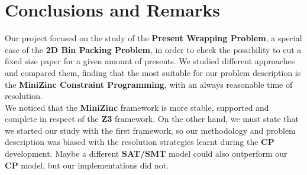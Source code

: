 \chapter{Conclusions and Remarks}
Our project focused on the study of the \textbf{Present Wrapping Problem}, a special case of the \textbf{2D Bin Packing Problem}, in order to check the
possibility to cut a fixed size paper for a given amount of presents. We studied different approaches and compared them, finding that the most suitable
for our problem description is the \textbf{MiniZinc Constraint Programming}, with an always reasonable time of resolution.\\

We noticed that the \textbf{MiniZinc} framework is more stable, supported and complete in respect of the \textbf{Z3} framework. On the other hand,
we must state that we started our study with the first framework, so our methodology and problem description was biased with the resolution strategies
learnt during the \textbf{CP} development. Maybe a different \textbf{SAT/SMT} model could also outperform our \textbf{CP} model, but our implementations did not.